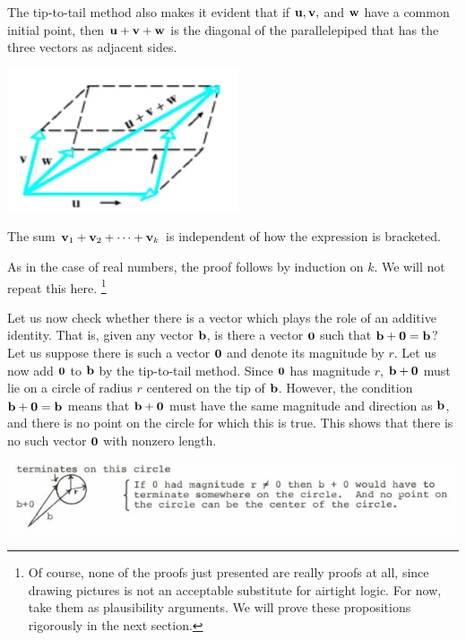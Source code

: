 \documentclass[12pt,letterpaper,reqno]{article}
\numberwithin{equation}{section}
\begin{document}
The tip-to-tail method also makes it evident that if ${\bf u}, {\bf v},$ and ${\bf w}$ have a common initial point, then ${\bf u}+{\bf v}+{\bf w}$ is the diagonal of the parallelepiped that has the three vectors as adjacent sides.

\begin{center}
	\includegraphics[scale=0.5]{figures_mvc/volume_of_parallelepiped_vectors}
\end{center}

\begin{cor}
The sum ${\bf v}_1+{\bf v}_2+\cdots + {\bf v}_k$ is independent of how the expression is bracketed.	
\end{cor}

\begin{pf}
As in the case of real numbers, the proof follows by induction on $k$. We will not repeat this here. \footnote{Of course, none of the proofs just presented are really proofs at all, since drawing pictures is not an acceptable substitute for airtight logic. For now, take them as plausibility arguments. We will prove these propositions rigorously in the next section.}	
\end{pf}

Let us now check whether there is a vector which plays the role of an additive identity. That is, given any vector ${\bf b}$, is there a vector ${\bf 0}$ such that ${\bf b}+{\bf 0}={\bf b}$? Let us suppose there is such a vector ${\bf 0}$ and denote its magnitude by $r$. Let us now add ${\bf 0}$ to ${\bf b}$ by the tip-to-tail method. Since ${\bf 0}$ has magnitude $r$, ${\bf b}+{\bf 0}$ must lie on a circle of radius $r$ centered on the tip of ${\bf b}$. However, the condition ${\bf b}+{\bf 0}={\bf b}$ means that ${\bf b}+{\bf 0}$ must have the same magnitude and direction as ${\bf b}$, and there is no point on the circle for which this is true. This shows that there is no such vector ${\bf 0}$ with nonzero length. 
\begin{center}
	\includegraphics[scale=0.5]{figures_mvc/b_plus_zero_circle}
\end{center}
\end{document}
